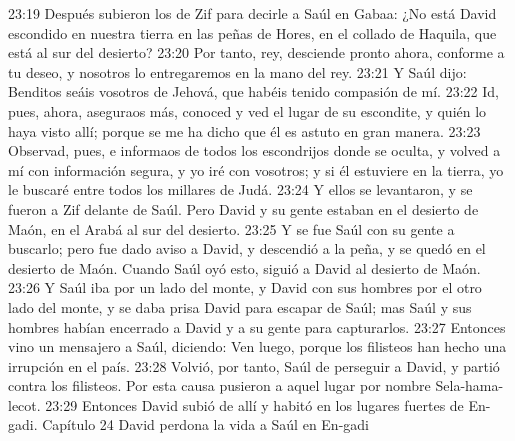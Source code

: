 23:19 Después subieron los de Zif para decirle a Saúl en Gabaa: ¿No está David escondido en nuestra tierra en las peñas de Hores, en el collado de Haquila, que está al sur del desierto?  
23:20 Por tanto, rey, desciende pronto ahora, conforme a tu deseo, y nosotros lo entregaremos en la mano del rey.  
23:21 Y Saúl dijo: Benditos seáis vosotros de Jehová, que habéis tenido compasión de mí.  
23:22 Id, pues, ahora, aseguraos más, conoced y ved el lugar de su escondite, y quién lo haya visto allí; porque se me ha dicho que él es astuto en gran manera.  
23:23 Observad, pues, e informaos de todos los escondrijos donde se oculta, y volved a mí con información segura, y yo iré con vosotros; y si él estuviere en la tierra, yo le buscaré entre todos los millares de Judá.  
23:24 Y ellos se levantaron, y se fueron a Zif delante de Saúl. Pero David y su gente estaban en el desierto de Maón, en el Arabá al sur del desierto.  
23:25 Y se fue Saúl con su gente a buscarlo; pero fue dado aviso a David, y descendió a la peña, y se quedó en el desierto de Maón. Cuando Saúl oyó esto, siguió a David al desierto de Maón.  
23:26 Y Saúl iba por un lado del monte, y David con sus hombres por el otro lado del monte, y se daba prisa David para escapar de Saúl; mas Saúl y sus hombres habían encerrado a David y a su gente para capturarlos.  
23:27 Entonces vino un mensajero a Saúl, diciendo: Ven luego, porque los filisteos han hecho una irrupción en el país.  
23:28 Volvió, por tanto, Saúl de perseguir a David, y partió contra los filisteos. Por esta causa pusieron a aquel lugar por nombre Sela-hama-lecot.  
23:29 Entonces David subió de allí y habitó en los lugares fuertes de En-gadi.  
Capítulo 24
David perdona la vida a Saúl en En-gadi  

